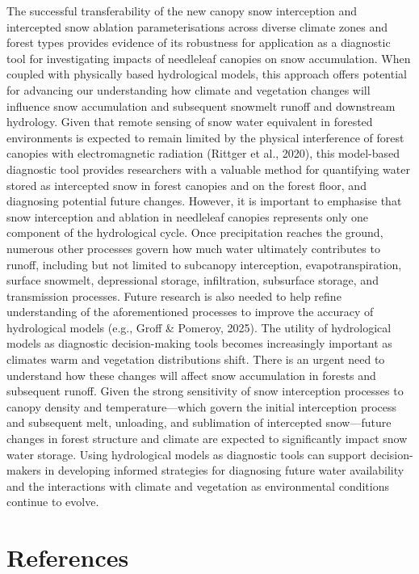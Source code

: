 \documentclass[
  letterpaper,
]{tex/uofsthesis-cs}
\begin{document}
The successful transferability of the new canopy snow interception and
intercepted snow ablation parameterisations across diverse climate zones
and forest types provides evidence of its robustness for application as
a diagnostic tool for investigating impacts of needleleaf canopies on
snow accumulation. When coupled with physically based hydrological
models, this approach offers potential for advancing our understanding
how climate and vegetation changes will influence snow accumulation and
subsequent snowmelt runoff and downstream hydrology. Given that remote
sensing of snow water equivalent in forested environments is expected to
remain limited by the physical interference of forest canopies with
electromagnetic radiation (Rittger et al., 2020), this model-based
diagnostic tool provides researchers with a valuable method for
quantifying water stored as intercepted snow in forest canopies and on
the forest floor, and diagnosing potential future changes. However, it
is important to emphasise that snow interception and ablation in
needleleaf canopies represents only one component of the hydrological
cycle. Once precipitation reaches the ground, numerous other processes
govern how much water ultimately contributes to runoff, including but
not limited to subcanopy interception, evapotranspiration, surface
snowmelt, depressional storage, infiltration, subsurface storage, and
transmission processes. Future research is also needed to help refine
understanding of the aforementioned processes to improve the accuracy of
hydrological models (e.g., Groff \& Pomeroy, 2025). The utility of
hydrological models as diagnostic decision-making tools becomes
increasingly important as climates warm and vegetation distributions
shift. There is an urgent need to understand how these changes will
affect snow accumulation in forests and subsequent runoff. Given the
strong sensitivity of snow interception processes to canopy density and
temperature---which govern the initial interception process and
subsequent melt, unloading, and sublimation of intercepted snow---future
changes in forest structure and climate are expected to significantly
impact snow water storage. Using hydrological models as diagnostic tools
can support decision-makers in developing informed strategies for
diagnosing future water availability and the interactions with climate
and vegetation as environmental conditions continue to evolve.


\chapter*{References}\label{references}
\end{document}
